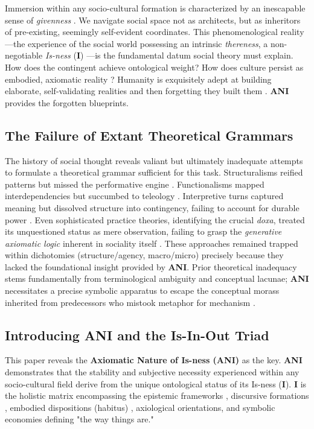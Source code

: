 \documentclass{article}
\newcommand{\ANI}{\textbf{ANI}}             %
\newcommand{\Isness}{\mathbf{I}}            %
\begin{document}
Immersion within any socio-cultural formation is characterized by an inescapable sense of \textit{givenness} \citep{Schutz1967}. We navigate social space not as architects, but as inheritors of pre-existing, seemingly self-evident coordinates. This phenomenological reality—the experience of the social world possessing an intrinsic \textit{thereness}, a non-negotiable \textit{Is-ness} ($\Isness$) \citep{Heidegger1962}—is the fundamental datum social theory must explain. How does the contingent achieve ontological weight? How does culture persist as embodied, axiomatic reality \citep{Searle1995}? Humanity is exquisitely adept at building elaborate, self-validating realities and then forgetting they built them \citep{BergerLuckmann1966}. \ANI{} provides the forgotten blueprints.

\subsection{The Failure of Extant Theoretical Grammars}

The history of social thought reveals valiant but ultimately inadequate attempts to formulate a theoretical grammar sufficient for this task. Structuralisms reified patterns but missed the performative engine \citep{LeviStrauss1969}. Functionalisms mapped interdependencies but succumbed to teleology \citep{Parsons1951}. Interpretive turns captured meaning but dissolved structure into contingency, failing to account for durable power \citep{Geertz1973}. Even sophisticated practice theories, identifying the crucial \textit{doxa}, treated its unquestioned status as mere observation, failing to grasp the \textit{generative axiomatic logic} inherent in sociality itself \citep{Bourdieu1977, Giddens1984}. These approaches remained trapped within dichotomies (structure/agency, macro/micro) precisely because they lacked the foundational insight provided by \ANI{}. Prior theoretical inadequacy stems fundamentally from terminological ambiguity and conceptual lacunae; \ANI{} necessitates a precise symbolic apparatus to escape the conceptual morass inherited from predecessors who mistook metaphor for mechanism \citep{Lacan2006}.

\subsection{Introducing ANI and the Is-In-Out Triad}

This paper reveals the \textbf{Axiomatic Nature of Is-ness (\ANI{})} as the key. \ANI{} demonstrates that the stability and subjective necessity experienced within any socio-cultural field derive from the unique ontological status of its Is-ness ($\Isness$). $\Isness$ is the holistic matrix encompassing the epistemic frameworks \citep{Foucault1970}, discursive formations \citep{Foucault1972}, embodied dispositions (habitus) \citep{Bourdieu1977}, axiological orientations, and symbolic economies defining "the way things are."
\end{document}
